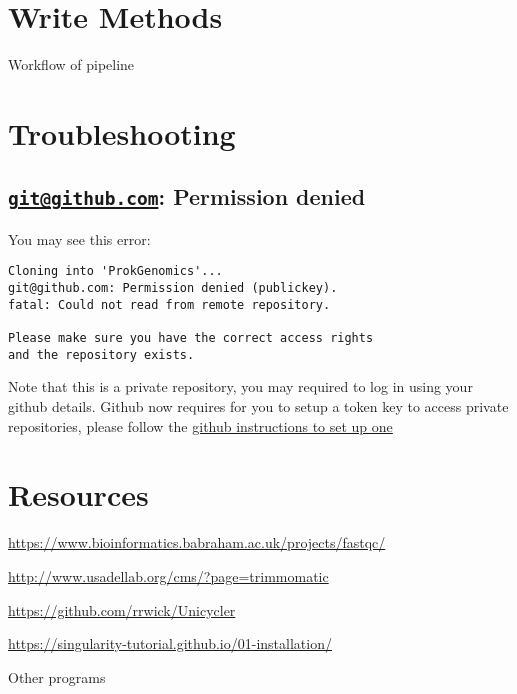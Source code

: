 \documentclass[
]{book}
\begin{document}
\hypertarget{write-methods}{%
\chapter{Write Methods}\label{write-methods}}

Workflow of pipeline

\hypertarget{troubleshooting}{%
\chapter{Troubleshooting}\label{troubleshooting}}

\hypertarget{gitgithub.com-permission-denied}{%
\section{\texorpdfstring{\href{mailto:git@github.com}{\nolinkurl{git@github.com}}: Permission denied}{git@github.com: Permission denied}}\label{gitgithub.com-permission-denied}}

You may see this error:

\begin{verbatim}
Cloning into 'ProkGenomics'...
git@github.com: Permission denied (publickey).
fatal: Could not read from remote repository.

Please make sure you have the correct access rights
and the repository exists.
\end{verbatim}

Note that this is a private repository, you may required to log in using your github details. Github now requires for you to setup a token key to access private repositories, please follow the \href{https://docs.github.com/en/authentication/keeping-your-account-and-data-secure/managing-your-personal-access-tokens}{github instructions to set up one}

\hypertarget{resources}{%
\chapter{Resources}\label{resources}}

\url{https://www.bioinformatics.babraham.ac.uk/projects/fastqc/}

\url{http://www.usadellab.org/cms/?page=trimmomatic}

\url{https://github.com/rrwick/Unicycler}

\url{https://singularity-tutorial.github.io/01-installation/}

Other programs
\end{document}
